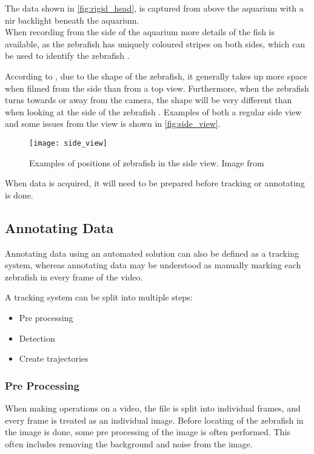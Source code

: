 The data shown in \autoref{fig:rigid_head}, is captured from above the aquarium with a \gls{nir} backlight beneath the aquarium.\\

When recording from the side of the aquarium more details of the fish is available, as the zebrafish has uniquely coloured stripes on both sides, which can be used to identify the zebrafish \citep{Karpova2018}.

According to \cite{Qian2017}, due to the shape of the zebrafish, it generally takes up more space when filmed from the side than from a top view. Furthermore, when the zebrafish turns towards or away from the camera, the shape will be very different than when looking at the side of the zebrafish \citep{Pedersen2017}. Examples of both a regular side view and some issues from the view is shown in \autoref{fig:side_view}.

\begin{figure}[H]
	\centering
	\texttt{[image: side\_view]}
	\caption{Examples of positions of zebrafish in the side view. Image from \cite{Pedersen2017}}
	\label{fig:side_view}
\end{figure}

When data is acquired, it will need to be prepared before tracking or annotating is done. 

\subsection{Annotating Data}

Annotating data using an automated solution can also be defined as a tracking system, whereas annotating data may be understood as manually marking each zebrafish in every frame of the video. 

A tracking system can be split into multiple steps:

\begin{itemize}
	\item Pre processing
	\item Detection
	\item Create trajectories
\end{itemize}

\subsubsection{Pre Processing}
When making operations on a video, the file is split into individual frames, and every frame is treated as an individual image. Before locating of the zebrafish in the image is done, some pre processing of the image is often performed. This often includes removing the background and noise from the image.


